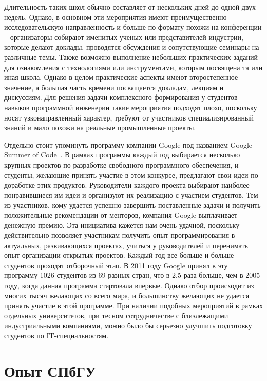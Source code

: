\documentclass[a5paper]{article}
\begin{document}
Длительность таких школ обычно составляет от нескольких дней до одной-двух недель. Однако, в основном эти мероприятия имеют преимущественно исследовательскую направленность  и больше по формату похожи на конференции -- организаторы собирают именитых ученых или представителей индустрии, которые делают доклады, проводятся обсуждения и сопутствующие семинары на различные темы. Также возможно выполнение небольших практических заданий для ознакомления с технологиями или инструментами, которым посвящена та или иная школа. Однако в целом практические аспекты имеют второстепенное значение, а большая часть времени посвящается докладам, лекциям и дискуссиям. Для решения задачи комплексного формирования у студентов навыков программной инженерии такие мероприятия подходят плохо, поскольку носят узконаправленный характер, требуют от участников специализированный знаний и мало похожи на  реальные промышленные проекты.

Отдельно стоит упоминуть программу компании Google под названием Google Summer of Code~\cite{google}. В рамках программы каждый год выбирается несколько крупных проектов по разработке свободного программного обеспечения, и студенты, желающие принять участие в этом конкурсе, предлагают свои идеи по доработке этих продуктов. Руководители каждого проекта выбирают наиболее понравившиеся им идеи и организуют их реализацию с участием студентов. Тем из участников, кому удается успешно завершить поставленные задачи и получить положительные рекомендации от менторов, компания Google выплачивает денежную премию. Эта инициатива  кажется нам очень удачной, поскольку действительно позволяет участникам получить опыт программирования в актуальных, развивающихся проектах, учиться у руководителей и перенимать опыт организации открытых проектов. Каждый год все больше и больше студентов проходят отборочный этап.  В 2011 году Google принял в эту программу 1026 студентов из 69 разных стран, что в 2.5 раза больше, чем в 2005 году, когда данная программа стартовала впервые. Однако отбор происходит из многих тысяч желающих со всего мира, и большинству желающих не удается принять участие в этой программе. При наличии подобных мероприятий в рамках отдельных университетов, при тесном сотрудничестве с близлежащими индустриальными компаниями, можно было бы серьезно улучшить подготовку студентов по IT-специальностям.

\section{Опыт СПбГУ}
\end{document}

